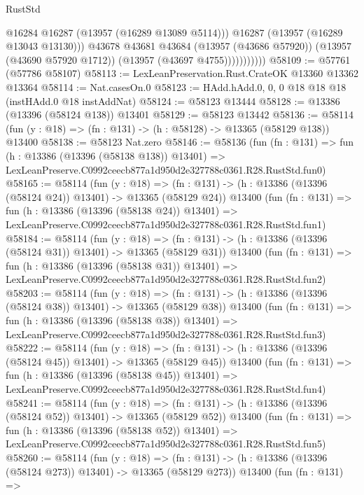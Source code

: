 \begin{lexlean}{RustStd}
\begin{coremodule}
                          @16284
                          @16287
                          (@13957 (@16289 @13089 @5114)))
                        @16287
                        (@13957 (@16289 @13043 @13130)))
                      @43678
                      @43681
                      @43684
                      (@13957 (@43686 @57920))
                      (@13957 (@43690 @57920 @1712))
                      (@13957 (@43697 @4755)))))))))))
@58109 := @57761 (@57786 @58107)
@58113 := LexLeanPreservation.Rust.CrateOK @13360 @13362 @13364
@58114 := Nat.casesOn.{0}
@58123 := HAdd.hAdd.{0, 0, 0} @18 @18 @18 (instHAdd.{0} @18 instAddNat)
@58124 := @58123 @13444
@58128 := @13386 (@13396 (@58124 @138)) @13401
@58129 := @58123 @13442
@58136 := @58114 (fun (y : @18) => (fn : @131) -> (h : @58128) -> @13365 (@58129 @138)) @13400
@58138 := @58123 Nat.zero
@58146 := @58136
    (fun (fn : @131) =>
    fun (h : @13386 (@13396 (@58138 @138)) @13401) =>
    LexLeanPreserve.C0992ceecb877a1d950d2e327788c0361.R28.RustStd.fun0)
@58165 := @58114
    (fun (y : @18) =>
    (fn : @131) -> (h : @13386 (@13396 (@58124 @24)) @13401) -> @13365 (@58129 @24))
    @13400
    (fun (fn : @131) =>
    fun (h : @13386 (@13396 (@58138 @24)) @13401) =>
    LexLeanPreserve.C0992ceecb877a1d950d2e327788c0361.R28.RustStd.fun1)
@58184 := @58114
    (fun (y : @18) =>
    (fn : @131) -> (h : @13386 (@13396 (@58124 @31)) @13401) -> @13365 (@58129 @31))
    @13400
    (fun (fn : @131) =>
    fun (h : @13386 (@13396 (@58138 @31)) @13401) =>
    LexLeanPreserve.C0992ceecb877a1d950d2e327788c0361.R28.RustStd.fun2)
@58203 := @58114
    (fun (y : @18) =>
    (fn : @131) -> (h : @13386 (@13396 (@58124 @38)) @13401) -> @13365 (@58129 @38))
    @13400
    (fun (fn : @131) =>
    fun (h : @13386 (@13396 (@58138 @38)) @13401) =>
    LexLeanPreserve.C0992ceecb877a1d950d2e327788c0361.R28.RustStd.fun3)
@58222 := @58114
    (fun (y : @18) =>
    (fn : @131) -> (h : @13386 (@13396 (@58124 @45)) @13401) -> @13365 (@58129 @45))
    @13400
    (fun (fn : @131) =>
    fun (h : @13386 (@13396 (@58138 @45)) @13401) =>
    LexLeanPreserve.C0992ceecb877a1d950d2e327788c0361.R28.RustStd.fun4)
@58241 := @58114
    (fun (y : @18) =>
    (fn : @131) -> (h : @13386 (@13396 (@58124 @52)) @13401) -> @13365 (@58129 @52))
    @13400
    (fun (fn : @131) =>
    fun (h : @13386 (@13396 (@58138 @52)) @13401) =>
    LexLeanPreserve.C0992ceecb877a1d950d2e327788c0361.R28.RustStd.fun5)
@58260 := @58114
    (fun (y : @18) =>
    (fn : @131) -> (h : @13386 (@13396 (@58124 @273)) @13401) -> @13365 (@58129 @273))
    @13400
    (fun (fn : @131) =>

\end{coremodule}
\end{lexlean}
